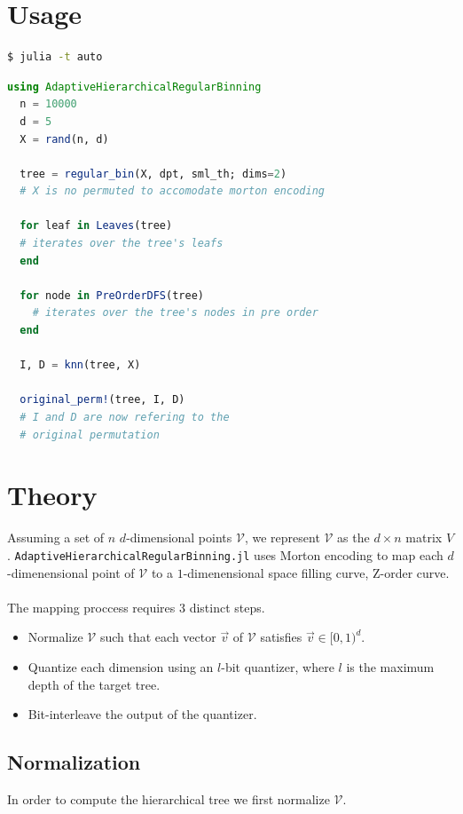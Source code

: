 \documentclass{juliacon}
\begin{document}
\section{Usage}

\begin{lstlisting}[language = Bash]
  $ julia -t auto
\end{lstlisting}

\begin{lstlisting}[language = Julia]
  using AdaptiveHierarchicalRegularBinning
  n = 10000
  d = 5
  X = rand(n, d)

  tree = regular_bin(X, dpt, sml_th; dims=2)
  # X is no permuted to accomodate morton encoding

  for leaf in Leaves(tree)
  # iterates over the tree's leafs
  end

  for node in PreOrderDFS(tree)
    # iterates over the tree's nodes in pre order
  end

  I, D = knn(tree, X)

  original_perm!(tree, I, D)
  # I and D are now refering to the
  # original permutation
\end{lstlisting}


\section{Theory}
Assuming a set of $n$ $d$-dimensional points $\mathcal{V}$, we represent $\mathcal{V}$ as
the $d \times n$ matrix $V$. \verb|AdaptiveHierarchicalRegularBinning.jl| uses Morton
encoding to map each $d$-dimenensional point of $\mathcal{V}$ to a $1$-dimenensional
space filling curve, Z-order curve.
\\\\
The mapping proccess requires 3 distinct steps.

\begin{itemize}
  \item Normalize $\mathcal{V}$ such that each vector $\vec{v}$ of $\mathcal{V}$
  satisfies $\vec{v} \in [0,1)^d$.
  \item Quantize each dimension using an $l$-bit quantizer, where $l$ is the maximum
  depth of the target tree.
  \item Bit-interleave the output of the quantizer.
\end{itemize}

\subsection{Normalization}
In order to compute the hierarchical tree we first normalize $\mathcal{V}$.
\end{document}
